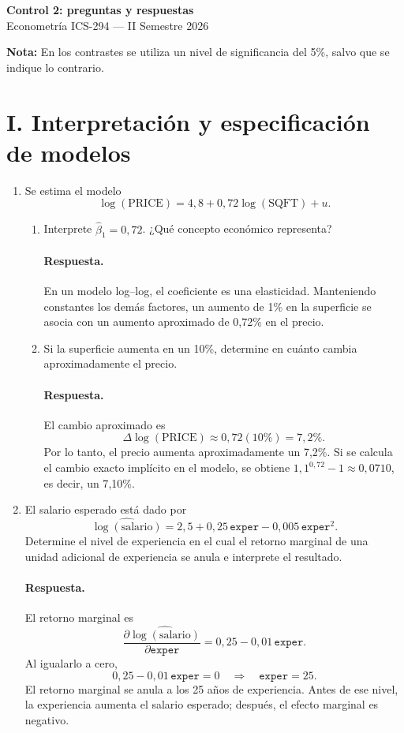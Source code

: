 \documentclass[letterpaper,11pt]{article}
\newcommand{\respuesta}{\color{blue}\paragraph{Respuesta.}}
\begin{document}
\begin{center}
    {\Large \textbf{Control 2: preguntas y respuestas}}\\
    Econometría ICS-294 --- II Semestre 2026
\end{center}

\vspace{0.3cm}
\noindent\textbf{Nota:} En los contrastes se utiliza un nivel de significancia
del 5\%, salvo que se indique lo contrario.

\section*{I. Interpretación y especificación de modelos}

\begin{enumerate}

\item\color{black} Se estima el modelo
\[
    \log(\text{PRICE})=4{,}8+0{,}72\log(\text{SQFT})+u.
\]
\begin{enumerate}[label=(\alph*)]
    \item\color{black} Interprete $\hat\beta_1=0{,}72$. ¿Qué concepto económico representa?

    \respuesta En un modelo log--log, el coeficiente es una elasticidad.
    Manteniendo constantes los demás factores, un aumento de 1\% en la
    superficie se asocia con un aumento aproximado de 0{,}72\% en el precio.

    \item\color{black} Si la superficie aumenta en un 10\%, determine en cuánto cambia
    aproximadamente el precio.

    \respuesta El cambio aproximado es
    \[
        \Delta\log(\text{PRICE})\approx 0{,}72(10\%)=7{,}2\%.
    \]
    Por lo tanto, el precio aumenta aproximadamente un 7{,}2\%. Si se calcula
    el cambio exacto implícito en el modelo, se obtiene
    $1{,}1^{0{,}72}-1\approx 0{,}0710$, es decir, un 7{,}10\%.
\end{enumerate}

\item\color{black} El salario esperado está dado por
\[
    \widehat{\log(\text{salario})}
    =2{,}5+0{,}25\,\texttt{exper}
    -0{,}005\,\texttt{exper}^{2}.
\]
Determine el nivel de experiencia en el cual el retorno marginal de una unidad
adicional de experiencia se anula e interprete el resultado.

\respuesta El retorno marginal es
\[
    \frac{\partial\widehat{\log(\text{salario})}}
         {\partial\texttt{exper}}
    =0{,}25-0{,}01\,\texttt{exper}.
\]
Al igualarlo a cero,
\[
    0{,}25-0{,}01\,\texttt{exper}=0
    \quad\Longrightarrow\quad \texttt{exper}=25.
\]
El retorno marginal se anula a los 25 años de experiencia. Antes de ese
nivel, la experiencia aumenta el salario esperado; después, el efecto
marginal es negativo.

\end{enumerate}
\end{document}
